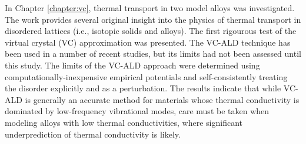 In Chapter \ref{chapter:vc}, thermal transport in two model alloys 
was investigated. The work provides several original 
insight into the physics of thermal 
transport in disordered lattices (i.e., isotopic solids and alloys). 
The first rigourous test of the virtual crystal (VC) approximation 
was presented. The VC-ALD technique has been used in a number of 
recent studies,
\cite{garg_role_2011,tian_phonon_2012,lindsay_thermal_2012,
li_thermal_2012,luckyanova_coherent_2012} 
but its limits had not been assessed until this study.  
The limits of the VC-ALD 
approach were determined using computationally-inexpensive empirical 
potentials and self-consistently treating the disorder explicitly 
and as a perturbation. 
The results indicate that while VC-ALD is generally 
an accurate method for materials 
whose thermal conductivity is dominated by low-frequency vibrational 
modes, care must be taken when modeling alloys with low thermal 
conductivities, where significant underprediction of thermal 
conductivity is likely. 

